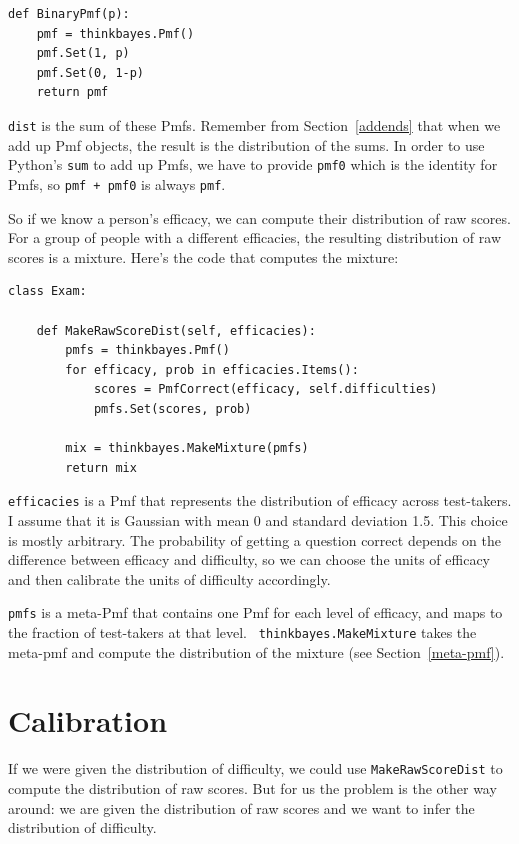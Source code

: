 \documentclass[12pt]{book}
\begin{document}
\begin{verbatim}
def BinaryPmf(p):
    pmf = thinkbayes.Pmf()
    pmf.Set(1, p)
    pmf.Set(0, 1-p)
    return pmf
\end{verbatim}

{\tt dist} is the sum of these Pmfs.  Remember from Section~\ref{addends}
that when we add up Pmf objects, the result is the distribution
of the sums.  In order to use Python's {\tt sum} to add up Pmfs,
we have to provide {\tt pmf0} which is the identity for Pmfs,
so {\tt pmf + pmf0} is always {\tt pmf}.

So if we know a person's efficacy, we can compute their distribution
of raw scores.  For a group of people with a different efficacies, the
resulting distribution of raw scores is a mixture.  Here's the code
that computes the mixture:

\begin{verbatim}
class Exam:

    def MakeRawScoreDist(self, efficacies):
        pmfs = thinkbayes.Pmf()
        for efficacy, prob in efficacies.Items():
            scores = PmfCorrect(efficacy, self.difficulties)
            pmfs.Set(scores, prob)

        mix = thinkbayes.MakeMixture(pmfs)
        return mix
\end{verbatim}

{\tt efficacies} is a Pmf that represents the distribution of efficacy
across test-takers.  I assume that it is Gaussian with mean 0 and
standard deviation 1.5.  This choice is mostly arbitrary.  The
probability of getting a question correct depends on the difference
between efficacy and difficulty, so we can choose the units of
efficacy and then calibrate the units of difficulty accordingly.

{\tt pmfs} is a meta-Pmf that contains one Pmf for each level of
efficacy, and maps to the fraction of test-takers at that level.  {\tt
  thinkbayes.MakeMixture} takes the meta-pmf and compute the
distribution of the mixture (see Section~\ref{meta-pmf}).


\section{Calibration}

If we were given the distribution of difficulty, we could use
\verb"MakeRawScoreDist" to compute the distribution of raw scores.
But for us the problem is the other way around: we are given the
distribution of raw scores and we want to infer the distribution of
difficulty.
\end{document}
